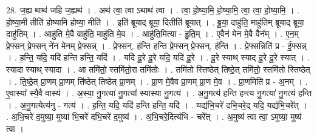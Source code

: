 \documentclass[17pt]{extarticle}
\begin{document}
28. ज॒ह्य थाथ॑ जहि ज॒ह्यथ॑ । . अथ॑ त्वा॒ त्वा ऽथाथ॑ त्वा । . त्वा॒ हो॒ष्या॒मि॒ हो॒ष्या॒मि॒ त्वा॒ त्वा॒ हो॒ष्या॒मि॒ । . हो॒ष्या॒मी तीति॑ होष्यामि होष्या॒ मीति॑ । . इति॑ ब्रूयाद् ब्रूया॒ दितीति॑ ब्रूयात् । . ब्रू॒या॒ दाहु॑ति॒ माहु॑तिम् ब्रूयाद् ब्रूया॒ दाहु॑तिम् । . आहु॑ति मे॒वै वाहु॑ति॒ माहु॑ति मे॒व । . आहु॑ति॒मित्या - हु॒ति॒म् । . ए॒वैन॑ मेन मे॒वै वैन᳚म् । . ए॒न॒म् प्रे॒फ्सन् प्रे॒फ्सन् ने॑न मेनम् प्रे॒फ्सन्न् । . प्रे॒फ्सन्. ह॑न्ति हन्ति प्रे॒फ्सन् प्रे॒फ्सन्. ह॑न्ति । . प्रे॒फ्सन्निति॑ प्र - ई॒फ्सन्न् । . ह॒न्ति॒ यदि॒ यदि॑ हन्ति हन्ति॒ यदि॑ । . यदि॑ दू॒रे दू॒रे यदि॒ यदि॑ दू॒रे । . दू॒रे स्याथ् स्याद् दू॒रे दू॒रे स्यात् । . स्यादा स्याथ् स्यादा । . आ तमि॑तो॒ स्तमि॑तो॒रा तमि॑तोः । . तमि॑तो स्तिष्ठेत् तिष्ठे॒त् तमि॑तो॒ स्तमि॑तो स्तिष्ठेत् । . ति॒ष्ठे॒त् प्रा॒णम् प्रा॒णम् ति॑ष्ठेत् तिष्ठेत् प्रा॒णम् । . प्रा॒ण मे॒वैव प्रा॒णम् प्रा॒ण मे॒व । . प्रा॒णमिति॑ प्र - अ॒नम् । . ए॒वास्या᳚ स्यै॒वै वास्य॑ । . अ॒स्या॒ नु॒गत्या॑ नु॒गत्या᳚ स्यास्या नु॒गत्य॑ । . अ॒नु॒गत्य॑ हन्ति हन्त्य नु॒गत्या॑ नु॒गत्य॑ हन्ति । . अ॒नु॒गत्येत्य॑नु - गत्य॑ । . ह॒न्ति॒ यदि॒ यदि॑ हन्ति हन्ति॒ यदि॑ । . यद्य॑भि॒चरे॑ दभि॒चरे॒द् यदि॒ यद्य॑भि॒चरे᳚त् । . अ॒भि॒चरे॑ द॒मुष्या॒ मुष्या॑ भि॒चरे॑ दभि॒चरे॑ द॒मुष्य॑ । . अ॒भि॒चरे॒दित्य॑भि - चरे᳚त् । . अ॒मुष्य॑ त्वा त्वा॒ ऽमुष्या॒ मुष्य॑ त्वा । \newline
\end{document}
